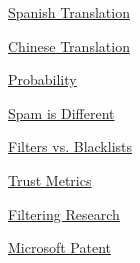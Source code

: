               
                \href{http://kapcoweb.com/p/docs/translations/a\_plan\_for\_spam/a\_plan\_for\_spam-es.html}{Spanish Translation}

              
            
            
              
            
            
              
            
            
              
                \href{http://people.brandeis.edu/\textasciitilde{}liji/\_private/translation/plan.htm}{Chinese Translation}

              
              
              
                \href{http://www.paulgraham.com/naivebayes.html}{Probability}

              
            
            
              
            
            
              
            
            
              
                \href{http://www.paulgraham.com/spamdiff.html}{Spam is Different}

              
              
              
                \href{http://www.paulgraham.com/falsepositives.html}{Filters vs. Blacklists}

              
            
            
              
            
            
              
            
            
              
                \href{http://www.levien.com/free/tmetric-HOWTO.html}{Trust Metrics}

              
              
              
                \href{http://www.paulgraham.com/bayeslinks.html}{Filtering Research}

              
            
            
              
            
            
              
            
            
              
                \href{http://www.paulgraham.com/msftpatent.html}{Microsoft Patent}

